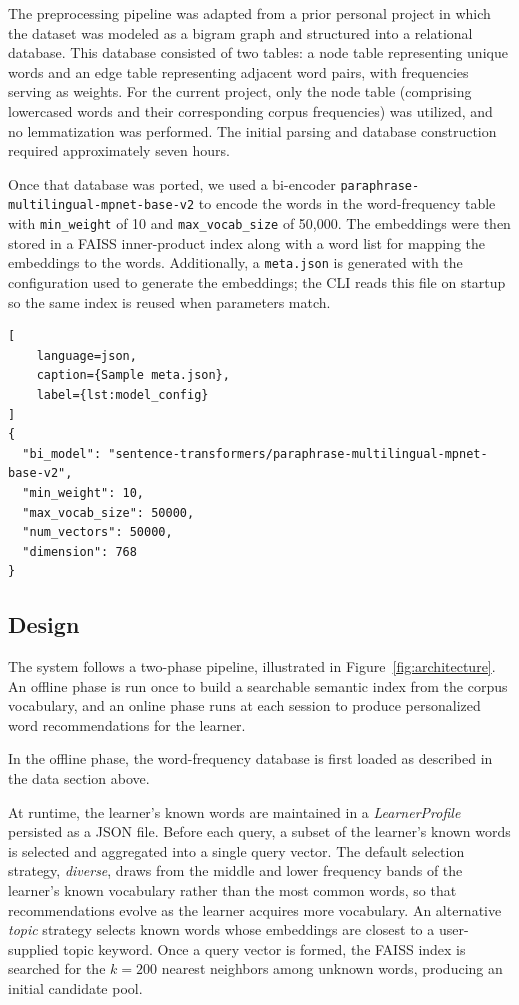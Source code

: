 \documentclass{article}
\begin{document}
The preprocessing pipeline was adapted from a prior personal project in which the dataset was modeled as a bigram graph and structured into a relational database. This database consisted of two tables: a node table representing unique words and an edge table representing adjacent word pairs, with frequencies serving as weights. For the current project, only the node table (comprising lowercased words and their corresponding corpus frequencies) was utilized, and no lemmatization was performed. The initial parsing and database construction required approximately seven hours.

Once that database was ported, we used a bi-encoder \texttt{paraphrase-\allowbreak{}multilingual-\allowbreak{}mpnet-\allowbreak{}base-v2} to encode the words in the word-frequency table with \texttt{min\_weight} of 10 and \texttt{max\_vocab\_size} of 50{,}000. The embeddings were then stored in a FAISS inner-product index along with a word list for mapping the embeddings to the words. Additionally, a \texttt{meta.json} is generated with the configuration used to generate the embeddings; the CLI reads this file on startup so the same index is reused when parameters match.

\begin{lstlisting}[
    language=json,
    caption={Sample meta.json},
    label={lst:model_config}
]
{
  "bi_model": "sentence-transformers/paraphrase-multilingual-mpnet-base-v2",
  "min_weight": 10,
  "max_vocab_size": 50000,
  "num_vectors": 50000,
  "dimension": 768
}
\end{lstlisting}

\subsection{Design}

The system follows a two-phase pipeline, illustrated in Figure~\ref{fig:architecture}. An offline phase is run once to build a searchable semantic index from the corpus vocabulary, and an online phase runs at each session to produce personalized word recommendations for the learner.

In the offline phase, the word-frequency database is first loaded as described in the data section above.

At runtime, the learner's known words are maintained in a \textit{LearnerProfile} persisted as a JSON file. Before each query, a subset of the learner's known words is selected and aggregated into a single query vector. The default selection strategy, \textit{diverse}, draws from the middle and lower frequency bands of the learner's known vocabulary rather than the most common words, so that recommendations evolve as the learner acquires more vocabulary. An alternative \textit{topic} strategy selects known words whose embeddings are closest to a user-supplied topic keyword. Once a query vector is formed, the FAISS index is searched for the $k = 200$ nearest neighbors among unknown words, producing an initial candidate pool.
\end{document}
